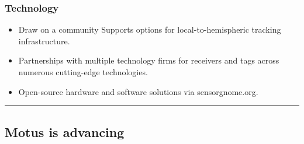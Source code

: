 \documentclass[
]{article}
\providecommand{\tightlist}{%
  \setlength{\itemsep}{0pt}\setlength{\parskip}{0pt}}
\begin{document}
\hypertarget{technology}{%
\subsubsection{Technology}\label{technology}}

\begin{itemize}
\tightlist
\item
  Draw on a community Supports options for local-to-hemispheric tracking
  infrastructure.
\item
  Partnerships with multiple technology firms for receivers and tags
  across numerous cutting-edge technologies.
\item
  Open-source hardware and software solutions via sensorgnome.org.
\end{itemize}

\begin{center}\rule{0.5\linewidth}{0.5pt}\end{center}

\hypertarget{motus-is-advancing}{%
\subsection{Motus is advancing}\label{motus-is-advancing}}
\end{document}
